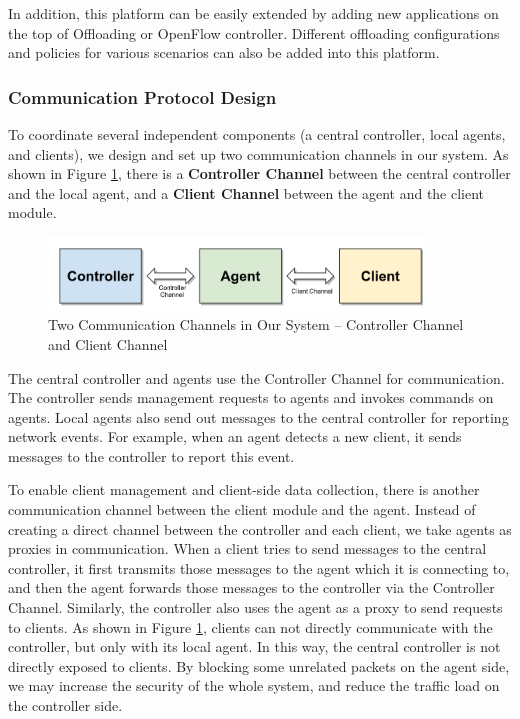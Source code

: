 \documentclass[english]{tktltiki}
\begin{document}
In addition, this platform can be easily extended by adding new applications on the top of Offloading or OpenFlow controller. Different offloading configurations and policies for various scenarios can also be added into this platform.

\subsubsection{Communication Protocol Design}

To coordinate several independent components (a central controller, local agents, and clients), we design and set up two communication channels in our system. As shown in Figure \ref{fig:communication}, there is a \textbf{Controller Channel} between the central controller and the local agent, and a \textbf{Client Channel} between the agent and the client module.

\begin{figure}[htbp]
  \centering
  \includegraphics[width=0.9\textwidth]{images/communication.png}
  \caption{Two Communication Channels in Our System -- Controller Channel and Client Channel}
  \label{fig:communication}
\end{figure}

The central controller and agents use the Controller Channel for communication. The controller sends management requests to agents and invokes commands on agents. Local agents also send out messages to the central controller for reporting network events. For example, when an agent detects a new client, it sends messages to the controller to report this event.

To enable client management and client-side data collection, there is another communication channel between the client module and the agent. Instead of creating a direct channel between the controller and each client, we take agents as proxies in communication. When a client tries to send messages to the central controller, it first transmits those messages to the agent which it is connecting to, and then the agent forwards those messages to the controller via the Controller Channel. Similarly, the controller also uses the agent as a proxy to send requests to clients. As shown in Figure \ref{fig:communication}, clients can not directly communicate with the controller, but only with its local agent. In this way, the central controller is not directly exposed to clients. By blocking some unrelated packets on the agent side, we may increase the security of the whole system, and reduce the traffic load on the controller side.
\end{document}

